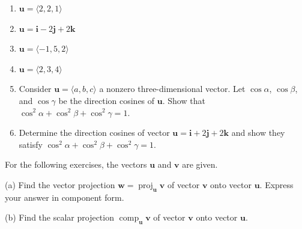 \documentclass{exercises}
\begin{document}
\begin{enumerate}[resume]
\item $\mathbf{u}=\langle2,2,1\rangle$
\item $\mathbf{u}=\mathbf{i}-2\mathbf{j}+2\mathbf{k}$
\item $\mathbf{u}=\langle-1,5,2\rangle$
\item $\mathbf{u}=\langle2,3,4\rangle$
\item Consider $\mathbf{u}=\langle a,b,c\rangle$ a nonzero three-dimensional vector. Let $\cos \alpha$, $\cos \beta$, and $\cos \gamma$ be the direction cosines of $\mathbf{u}$. Show that $\cos^{2}\alpha+\cos^{2}\beta+\cos^{2}\gamma=1$.
\item Determine the direction cosines of vector $\mathbf{u}=\mathbf{i}+2\mathbf{j}+2\mathbf{k}$ and show they satisfy $\cos^{2}\alpha+\cos^{2}\beta+\cos^{2}\gamma=1$.
\end{enumerate}

For the following exercises, the vectors $\mathbf{u}$ and $\mathbf{v}$ are given.


(a) Find the vector projection $\mathbf{w}=\operatorname{proj}_{\mathbf{u}}\mathbf{v}$ of vector $\mathbf{v}$ onto vector $\mathbf{u}$. Express your answer in component form.


(b) Find the scalar projection $\operatorname{comp}_{\mathbf{u}}\mathbf{v}$ of vector $\mathbf{v}$ onto vector $\mathbf{u}$.
\end{document}
